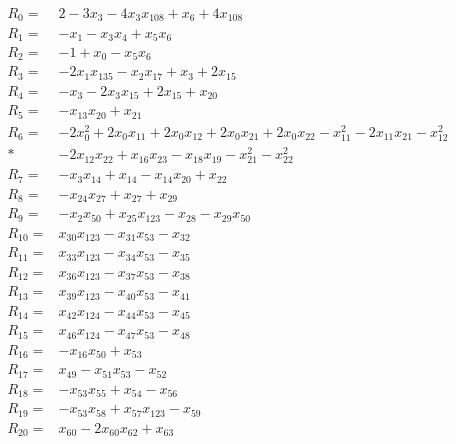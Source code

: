 \allowdisplaybreaks[4]
\begin{align*}
R_{0}={}&2-3x_{3}-4x_{3}x_{108}+x_{6}+4x_{108}\\[3pt]
R_{1}={}&-x_{1}-x_{3}x_{4}+x_{5}x_{6}\\[3pt]
R_{2}={}&-1+x_{0}-x_{5}x_{6}\\[3pt]
R_{3}={}&-2x_{1}x_{135}-x_{2}x_{17}+x_{3}+2x_{15}\\[3pt]
R_{4}={}&-x_{3}-2x_{3}x_{15}+2x_{15}+x_{20}\\[3pt]
R_{5}={}&-x_{13}x_{20}+x_{21}\\[3pt]
R_{6}={}&-2x_{0}^{2}+2x_{0}x_{11}+2x_{0}x_{12}+2x_{0}x_{21}+2x_{0}x_{22}-x_{11}^{2}-2x_{11}x_{21}-x_{12}^{2}\\*
&-2x_{12}x_{22}+x_{16}x_{23}-x_{18}x_{19}-x_{21}^{2}-x_{22}^{2}\\[3pt]
R_{7}={}&-x_{3}x_{14}+x_{14}-x_{14}x_{20}+x_{22}\\[3pt]
R_{8}={}&-x_{24}x_{27}+x_{27}+x_{29}\\[3pt]
R_{9}={}&-x_{2}x_{50}+x_{25}x_{123}-x_{28}-x_{29}x_{50}\\[3pt]
R_{10}={}&x_{30}x_{123}-x_{31}x_{53}-x_{32}\\[3pt]
R_{11}={}&x_{33}x_{123}-x_{34}x_{53}-x_{35}\\[3pt]
R_{12}={}&x_{36}x_{123}-x_{37}x_{53}-x_{38}\\[3pt]
R_{13}={}&x_{39}x_{123}-x_{40}x_{53}-x_{41}\\[3pt]
R_{14}={}&x_{42}x_{124}-x_{44}x_{53}-x_{45}\\[3pt]
R_{15}={}&x_{46}x_{124}-x_{47}x_{53}-x_{48}\\[3pt]
R_{16}={}&-x_{16}x_{50}+x_{53}\\[3pt]
R_{17}={}&x_{49}-x_{51}x_{53}-x_{52}\\[3pt]
R_{18}={}&-x_{53}x_{55}+x_{54}-x_{56}\\[3pt]
R_{19}={}&-x_{53}x_{58}+x_{57}x_{123}-x_{59}\\[3pt]
R_{20}={}&x_{60}-2x_{60}x_{62}+x_{63}\\[3pt]

\end{align*}
